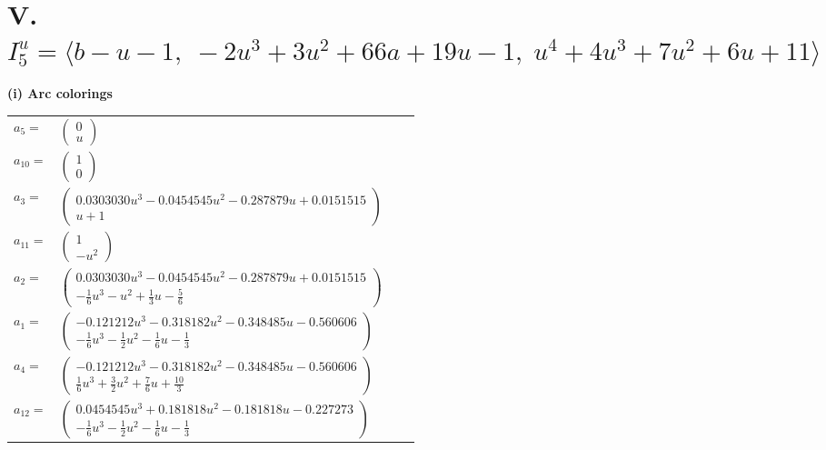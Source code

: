 \documentclass[1p]{elsarticle_modified}
\theoremstyle{definition}
\begin{document}
\centering \section*{V. $I^u_{5}= \langle b- u-1,\;-2 u^3+3 u^2+66 a+19 u-1,\;u^4+4 u^3+7 u^2+6 u+11 \rangle$}
\flushleft \textbf{(i) Arc colorings}\\
\begin{tabular}{m{7pt} m{180pt} m{7pt} m{180pt} }
\flushright $a_{5}=$&$\begin{pmatrix}0\\u\end{pmatrix}$ \\
\flushright $a_{10}=$&$\begin{pmatrix}1\\0\end{pmatrix}$ \\
\flushright $a_{3}=$&$\begin{pmatrix}0.0303030 u^{3}-0.0454545 u^{2}-0.287879 u+0.0151515\\u+1\end{pmatrix}$ \\
\flushright $a_{11}=$&$\begin{pmatrix}1\\- u^2\end{pmatrix}$ \\
\flushright $a_{2}=$&$\begin{pmatrix}0.0303030 u^{3}-0.0454545 u^{2}-0.287879 u+0.0151515\\-\frac{1}{6} u^3- u^2+\frac{1}{3} u-\frac{5}{6}\end{pmatrix}$ \\
\flushright $a_{1}=$&$\begin{pmatrix}-0.121212 u^{3}-0.318182 u^{2}-0.348485 u-0.560606\\-\frac{1}{6} u^3-\frac{1}{2} u^2-\frac{1}{6} u-\frac{1}{3}\end{pmatrix}$ \\
\flushright $a_{4}=$&$\begin{pmatrix}-0.121212 u^{3}-0.318182 u^{2}-0.348485 u-0.560606\\\frac{1}{6} u^3+\frac{3}{2} u^2+\frac{7}{6} u+\frac{10}{3}\end{pmatrix}$ \\
\flushright $a_{12}=$&$\begin{pmatrix}0.0454545 u^{3}+0.181818 u^{2}-0.181818 u-0.227273\\-\frac{1}{6} u^3-\frac{1}{2} u^2-\frac{1}{6} u-\frac{1}{3}\end{pmatrix}$ \\

\end{tabular}
\end{document}
